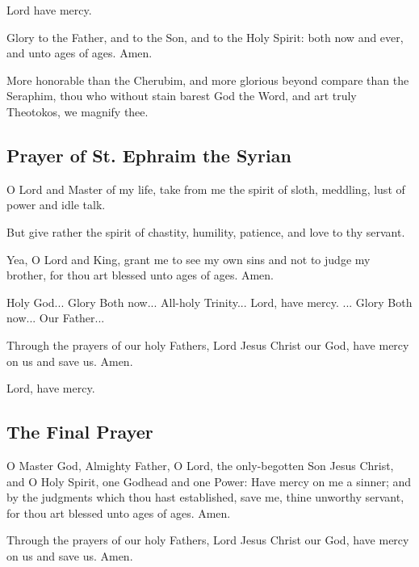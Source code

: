 Lord have mercy. 

Glory to the Father, and to the Son, and to the Holy Spirit: both now and ever, and unto ages of ages. Amen.

More honorable than the Cherubim, and more glorious beyond compare than the Seraphim, thou who without stain barest God the Word, and art truly Theotokos, we magnify thee.

\subsection{Prayer of St. Ephraim the Syrian}


O Lord and Master of my life, take from me the spirit of sloth, meddling, lust of power and idle talk. 

But give rather the spirit of chastity, humility, patience, and love to thy servant. 

Yea, O Lord and King, grant me to see my own sins and not to judge my brother, for thou art blessed unto ages of ages. Amen. 

Holy God... Glory  Both now... All-holy Trinity... Lord, have mercy. ... Glory  Both now... Our Father...

Through the prayers of our holy Fathers, Lord Jesus Christ our God, have mercy on us and save us. Amen.

Lord, have mercy. 

\subsection{The Final Prayer}

O Master God, Almighty Father, O Lord, the only-begotten Son Jesus Christ, and O Holy Spirit, one Godhead and one Power: Have mercy on me a sinner; and by the judgments which thou hast established, save me, thine unworthy servant, for thou art blessed unto ages of ages. Amen.

Through the prayers of our holy Fathers, Lord Jesus Christ our God, have mercy on us and save us. Amen.

\cleardoublepage
